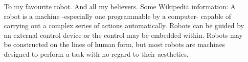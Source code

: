 To my favourite robot. And all my believers. Some Wikipedia information: A robot is a machine -especially one programmable by a computer- capable of carrying out a complex series of actions automatically. Robots can be guided by an external control device or the control may be embedded within. Robots may be constructed on the lines of human form, but most robots are machines designed to perform a task with no regard to their aesthetics. 
